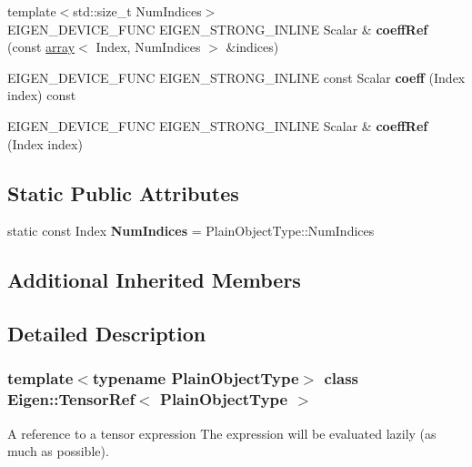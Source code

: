 \begin{DoxyCompactItemize}
{\footnotesize template$<$std\+::size\+\_\+t Num\+Indices$>$ }\\E\+I\+G\+E\+N\+\_\+\+D\+E\+V\+I\+C\+E\+\_\+\+F\+U\+NC E\+I\+G\+E\+N\+\_\+\+S\+T\+R\+O\+N\+G\+\_\+\+I\+N\+L\+I\+NE Scalar \& {\bfseries coeff\+Ref} (const \hyperlink{class_eigen_1_1array}{array}$<$ Index, Num\+Indices $>$ \&indices)
\item 
\mbox{\label{class_eigen_1_1_tensor_ref_a01da66613cf2600923a71da55a0f3d32}} 
E\+I\+G\+E\+N\+\_\+\+D\+E\+V\+I\+C\+E\+\_\+\+F\+U\+NC E\+I\+G\+E\+N\+\_\+\+S\+T\+R\+O\+N\+G\+\_\+\+I\+N\+L\+I\+NE const Scalar {\bfseries coeff} (Index index) const
\item 
\mbox{\label{class_eigen_1_1_tensor_ref_a326315b6b6d2f3a04ab756b6443f6325}} 
E\+I\+G\+E\+N\+\_\+\+D\+E\+V\+I\+C\+E\+\_\+\+F\+U\+NC E\+I\+G\+E\+N\+\_\+\+S\+T\+R\+O\+N\+G\+\_\+\+I\+N\+L\+I\+NE Scalar \& {\bfseries coeff\+Ref} (Index index)
\end{DoxyCompactItemize}
\subsection*{Static Public Attributes}
\begin{DoxyCompactItemize}
\item 
\mbox{\label{class_eigen_1_1_tensor_ref_a228f999f0b0fe0f6d9f114a729455dbf}} 
static const Index {\bfseries Num\+Indices} = Plain\+Object\+Type\+::\+Num\+Indices
\end{DoxyCompactItemize}
\subsection*{Additional Inherited Members}


\subsection{Detailed Description}
\subsubsection*{template$<$typename Plain\+Object\+Type$>$\newline
class Eigen\+::\+Tensor\+Ref$<$ Plain\+Object\+Type $>$}

A reference to a tensor expression The expression will be evaluated lazily (as much as possible). 

